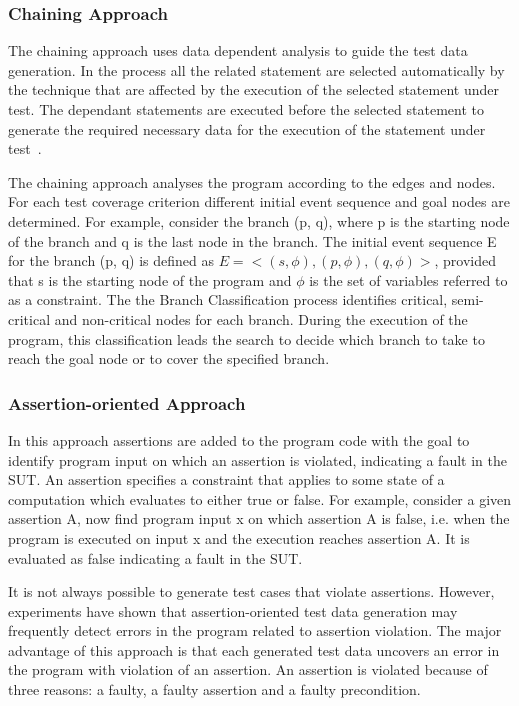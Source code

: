 \subsubsection{Chaining Approach}
The chaining approach uses data dependent analysis to guide the test data generation. In the process all the related statement are selected automatically by the technique that are affected by the execution of the selected statement under test. The dependant statements are executed before the selected statement to generate the required necessary data for the execution of the statement under test~\cite{ferguson1996chaining}.

The chaining approach analyses the program according to the edges and nodes. For each test coverage criterion different initial event sequence and goal nodes are determined. For example, consider  the branch (p, q), where p is  the starting node of the branch and q is the last node in the branch. The initial event sequence E for the branch (p, q) is defined as $E =< (s,\phi), (p,\phi),(q,\phi) >$, provided that s is the starting node of the program and $\phi$ is the set of variables referred to as a constraint. The the Branch Classification process identifies critical, semi-critical and non-critical nodes for each branch. During the execution of the program, this classification leads the search to decide which branch to take to reach the goal node or to cover the specified branch.  


\subsubsection{Assertion-oriented Approach}
In this approach assertions are added to the program code with the goal to identify program input on which an assertion is violated, indicating a fault in the SUT. An assertion specifies a constraint that applies to some state of a computation which evaluates to either true or false. For example, consider a given assertion A, now find program input x on which assertion A is false, i.e. when the program is executed on input x and the execution reaches assertion A. It is evaluated as false indicating a fault in the SUT.

It is not always possible to generate test cases that violate assertions. However, experiments have shown that assertion-oriented test data generation may frequently detect errors in the program related to assertion violation. The major advantage of this approach is that each generated test data uncovers an error in the program with violation of an assertion. An assertion is violated because of three reasons: a faulty, a faulty assertion and a faulty precondition.

